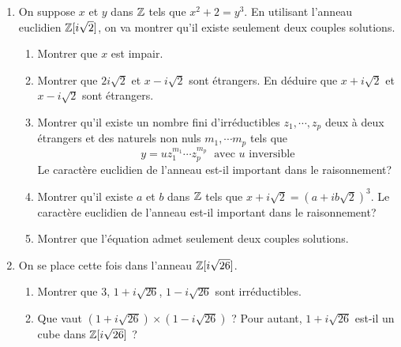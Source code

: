 \begin{enumerate}
  \item On suppose $x$ et $y$ dans $\mathbb{Z}$ tels que $x^2 + 2 = y^3$. En utilisant l'anneau euclidien $\mathbb{Z}[i\sqrt{2}]$, on va montrer qu'il existe seulement deux couples solutions.
  \begin{enumerate}
    \item  Montrer que $x$ est impair.
    \item Montrer que $2i\sqrt{2}$ et $x-i\sqrt{2}$ sont étrangers. En déduire que $x+i\sqrt{2}$ et $x-i\sqrt{2}$ sont étrangers.
    \item Montrer qu'il existe un nombre fini d'irréductibles $z_1, \cdots, z_p$ deux à deux étrangers et des naturels non nuls $m_1,\cdots m_p$ tels que 
    \begin{displaymath}
      y = u z_1^{m_1}\cdots z_p^{m_p} \; \text{ avec } u \text{ inversible}
    \end{displaymath}
    Le caractère euclidien de l'anneau est-il important dans le raisonnement?
    \item Montrer qu'il existe $a$ et $b$ dans $\mathbb{Z}$ tels que $x+i\sqrt{2}=(a+ib\sqrt{2})^3$. Le caractère euclidien de l'anneau est-il important dans le raisonnement?
    \item Montrer que l'équation admet seulement deux couples solutions.
  \end{enumerate}
  \item On se place cette fois dans l'anneau $\mathbb{Z}[i\sqrt{26}]$.
  \begin{enumerate}
    \item Montrer que $3$, $1+i\sqrt{26}$, $1-i\sqrt{26}$ sont irréductibles.
    \item Que vaut $(1+i\sqrt{26})\times (1-i\sqrt{26})$ ? \newline
    Pour autant, $1+i\sqrt{26}$ est-il un cube dans $\mathbb{Z}[i\sqrt{26}]$ ?
  \end{enumerate} 
\end{enumerate}
